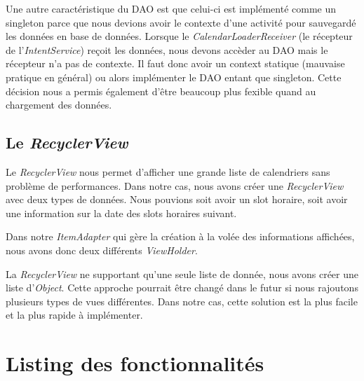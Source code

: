 \documentclass{article}
\begin{document}
            Une autre caractéristique du DAO est que celui-ci est implémenté comme un singleton
            parce que nous devions avoir le contexte d'une activité pour sauvegardé les données en
            base de données. Lorsque le \textit{CalendarLoaderReceiver} (le récepteur de
            l'\textit{IntentService}) reçoit les données, nous devons accèder au DAO mais le
            récepteur n'a pas de contexte. Il faut donc avoir un context statique (mauvaise pratique
            en général) ou alors implémenter le DAO entant que singleton. Cette décision nous a
            permis également d'être beaucoup plus fexible quand au chargement des données.

        \subsection{Le \textit{RecyclerView}}
            Le \textit{RecyclerView} nous permet d'afficher une grande liste de calendriers sans
            problème de performances. Dans notre cas, nous avons créer une \textit{RecyclerView}
            avec deux types de données. Nous pouvions soit avoir un slot horaire, soit avoir une
            information sur la date des slots horaires suivant.

            Dans notre \textit{ItemAdapter} qui gère la création à la volée des informations
            affichées, nous avons donc deux différents \textit{ViewHolder}.

            La \textit{RecyclerView} ne supportant qu'une seule liste de donnée, nous avons créer
            une liste d'\textit{Object}. Cette approche pourrait être changé dans le futur si nous
            rajoutons plusieurs types de vues différentes. Dans notre cas, cette solution est la
            plus facile et la plus rapide à implémenter.

	\section{Listing des fonctionnalités}
	
\end{document}
